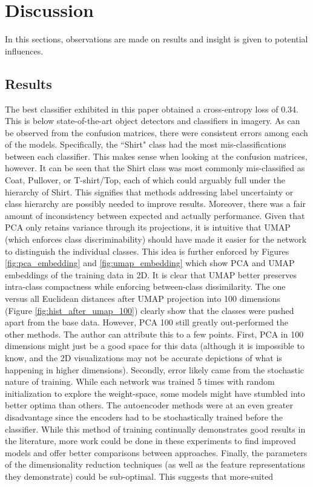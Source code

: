 \documentclass[conference]{IEEEtran}
\begin{document}
\vspace{5cm}
\section{Discussion} \label{Discussion}
In this sections, observations are made on results and insight is given to potential influences.

\subsection{Results}
The best classifier exhibited in this paper obtained a cross-entropy loss of 0.34.  This is below state-of-the-art object detectors and classifiers in imagery.  As can be observed from the confusion matrices, there were consistent errors among each of the models.  Specifically, the ``Shirt" class had the most mis-classifications between each classifier.  This makes sense when looking at the confusion matrices, however.  It can be seen that the Shirt class was most commonly mis-classified as Coat, Pullover, or T-shirt/Top, each of which could arguably full under the hierarchy of Shirt.  This signifies that methods addressing label uncertainty or class hierarchy are possibly needed to improve results.  Moreover, there was a fair amount of inconsistency between expected and actually performance.  Given that PCA only retains variance through its projections, it is intuitive that UMAP (which enforces class discriminability) should have made it easier for the network to distinguish the individual classes.  This idea is further enforced by Figures \ref{fig:pca_embedding} and \ref{fig:umap_embedding} which show PCA and UMAP embeddings of the training data in 2D.  It is clear that UMAP better preserves intra-class compactness while enforcing between-class dissimilarity.  The one versus all Euclidean distances after UMAP projection into 100 dimensions (Figure \ref{fig:hist_after_umap_100}) clearly show that the classes were pushed apart from the base data.  However, PCA 100 still greatly out-performed the other methods.  The author can attribute this to a few points.  First, PCA in 100 dimensions might just be a good space for this data (although it is impossible to know, and the 2D visualizations may not be accurate depictions of what is happening in higher dimensions).  Secondly, error likely came from the stochastic nature of training.  While each network was trained 5 times with random initialization to explore the weight-space, some models might have stumbled into better optima than others.  The autoencoder methods were at an even greater disadvantage since the encoders had to be stochastically trained before the classifier.  While this method of training continually demonstrates good results in the literature, more work could be done in these experiments to find improved models and offer better comparisons between approaches. Finally, the parameters of the dimensionality reduction techniques (as well as the feature representations they demonstrate) could be sub-optimal.  This suggests that more-suited 
\end{document}
